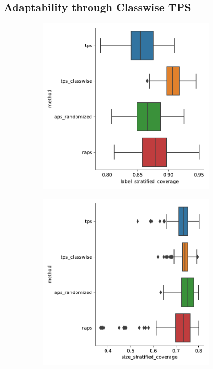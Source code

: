 \subsection{Adaptability through Classwise TPS}
\begin{figure}
    \centering
    \begin{subfigure}{0.48\linewidth}
    \includegraphics[width=\linewidth]{graphConformal/figures/split/citeseer_label_stratified_coverage}
    \end{subfigure}
    \begin{subfigure}{0.48\linewidth}
        \includegraphics[width=\linewidth]{graphConformal/figures/split/citeseer_size_stratified_coverage} 
     \end{subfigure}


\end{figure}
